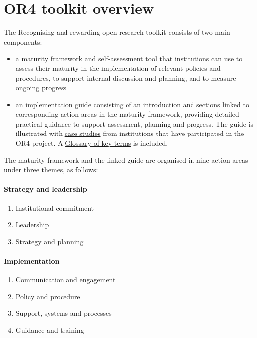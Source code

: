 \documentclass[
]{report}
\author{}
\date{}
\providecommand{\tightlist}{%
  \setlength{\itemsep}{0pt}\setlength{\parskip}{0pt}}\usepackage{longtable,booktabs,array}
\begin{document}
\chapter{OR4 toolkit overview}\label{or4-toolkit-overview}

The Recognising and rewarding open research toolkit consists of two main
components:

\begin{itemize}
\item
  a \href{maturity-framework.qmd}{maturity framework and self-assessment
  tool} that institutions can use to assess their maturity in the
  implementation of relevant policies and procedures, to support
  internal discussion and planning, and to measure ongoing progress
\item
  an \href{guide-contents.qmd}{implementation guide} consisting of an
  introduction and sections linked to corresponding action areas in the
  maturity framework, providing detailed practical guidance to support
  assessment, planning and progress. The guide is illustrated with
  \href{case-studies.qmd}{case studies} from institutions that have
  participated in the OR4 project. A \href{glossary.qmd}{Glossary of key
  terms} is included.
\end{itemize}

The maturity framework and the linked guide are organised in nine action
areas under three themes, as follows:

\subsubsection{Strategy and leadership}\label{strategy-and-leadership}

\begin{enumerate}
\def\labelenumi{\arabic{enumi}.}
\tightlist
\item
  Institutional commitment
\item
  Leadership
\item
  Strategy and planning
\end{enumerate}

\subsubsection{Implementation}\label{implementation}

\begin{enumerate}
\def\labelenumi{\arabic{enumi}.}
\setcounter{enumi}{3}
\tightlist
\item
  Communication and engagement
\item
  Policy and procedure
\item
  Support, systems and processes
\item
  Guidance and training
\end{enumerate}
\end{document}
